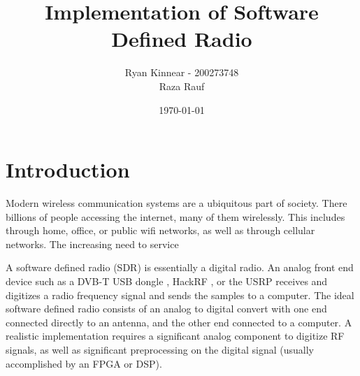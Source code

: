 \documentclass[a4paper, 12pt]{article}
\author{Ryan Kinnear - 200273748 \\ Raza Rauf}
\title{Implementation of Software Defined Radio}
\date{\today}
\begin{document}
\maketitle

\newpage
\tableofcontents
\newpage
\listoffigures
\newpage

\section{Introduction}
Modern wireless communication systems are a ubiquitous part of society.  There billions of people accessing the internet, many of them wirelessly.  This includes through home, office, or public wifi networks, as well as through cellular networks.  The increasing need to service

A software defined radio (SDR) is essentially a digital radio.  An analog front end device such as a DVB-T USB dongle \cite{usb_dongle}, HackRF \cite{hackrf}, or the USRP \cite{usrp} receives and digitizes a radio frequency signal and sends the samples to a computer.  The ideal software defined radio consists of an analog to digital convert with one end connected directly to an antenna, and the other end connected to a computer.  A realistic implementation requires a significant analog component to digitize RF signals, as well as significant preprocessing on the digital signal (usually accomplished by an FPGA or DSP).

\clearpage


\end{document}
